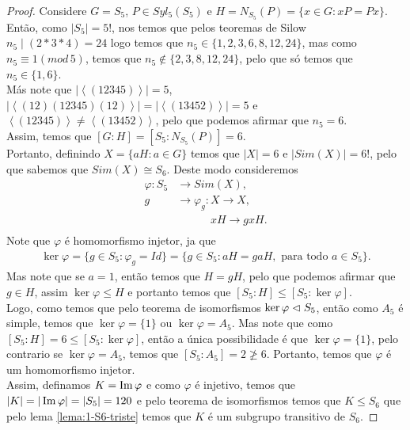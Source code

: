 \begin{proof} 
  Considere $G=S_5$, $P\in Syl_5(S_5)$ e $H=N_{S_5}(P)=\{x\in G:xP=Px\}$. Então, como $|S_5|=5!$, nos temos que pelos teoremas de Silow $n_5\mid (2\ast 3\ast 4)=24$ logo temos que $n_5\in\{1,2,3,6,8,12,24\}$, mas como $n_5\equiv 1(mod\,5)$, temos que $n_5\notin\{2,3,8,12,24\}$, pelo que só temos que $n_5\in\{1,6\}$.\\
  Más note que $|\left\langle (12345) \right\rangle|=5$, $|\left\langle (12)(12345)(12) \right\rangle|=|\left\langle (13452) \right\rangle|=5$ e $\left\langle (12345) \right\rangle\neq\left\langle (13452) \right\rangle$, pelo que podemos afirmar que $n_5=6$.\\
  Assim, temos que $[G:H]=[S_5:N_{S_5}(P)]=6$.\\
  Portanto, definindo $X=\{aH:a\in G\}$ temos que $|X|=6$ e $|Sim(X)|=6!$, pelo que sabemos que $Sim(X)\cong S_6$. Deste modo consideremos
  \begin{align*}
    \varphi:S_5&\to Sim(X),\\
            g&\to \varphi_g:X\to X,\\
  \phantom{g}&\phantom{\to \varphi_g:}xH\to gxH.
  \end{align*}  
  Note que $\varphi$ é homomorfismo injetor, ja que
  \begin{align*}
    \ker\varphi=\{g\in S_5:\varphi_{g}=Id\}=\{g\in S_5:aH=gaH,\text{ para todo }a\in S_5\}.
  \end{align*}
  Mas note que se $a=1$, então temos que $H=gH$, pelo que podemos afirmar que $g\in H$, assim $\ker\varphi\leq H$ e portanto temos que $[S_5:H]\leq[S_5:\ker\varphi]$.\\
  Logo, como temos que pelo teorema de isomorfismos $\ker\varphi\vartriangleleft S_5$, então como $A_5$ é simple, temos que $\ker\varphi=\{1\}$ ou $\ker\varphi= A_5$. Mas note que como $[S_5:H]=6\leq [S_5:\ker\varphi]$, então a única possibilidade é que $\ker\varphi=\{1\}$, pelo contrario se $\ker\varphi=A_5$, temos que $[S_5:A_5]=2\not\geq 6$. Portanto, temos que $\varphi$ é um homomorfismo injetor.\\
  Assim, definamos $K=\operatorname{Im}\varphi$ e como $\varphi$ é injetivo, temos que $|K|=|\operatorname{Im}\varphi|=|S_5|=120$ e pelo teorema de isomorfismos temos que $K\leq S_6$ que pelo lema \ref{lema:1-S6-triste} temos que $K$ é um subgrupo transitivo de $S_6$.


\end{proof}
